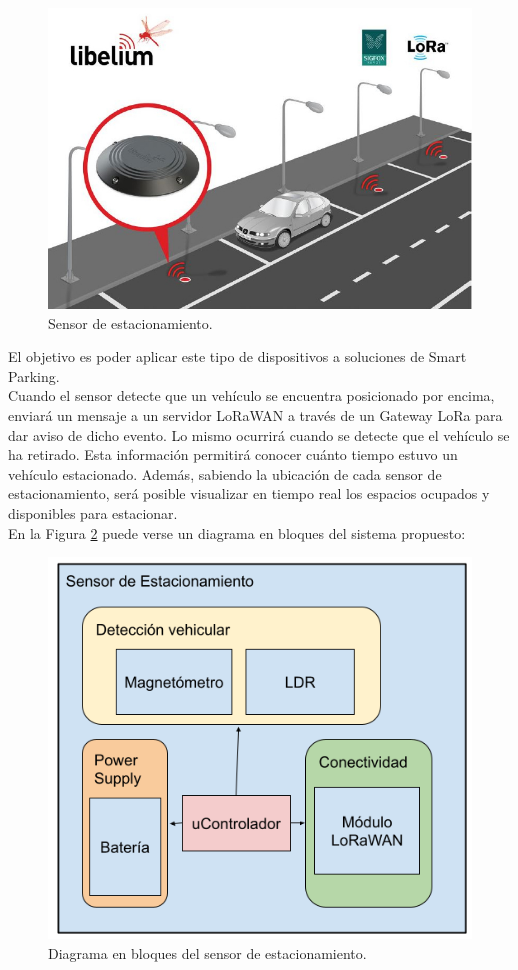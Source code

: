 \documentclass[
11pt, %
]{charter}
\begin{document}
\vspace{25px}

\begin{figure}[H]
\centering 
\includegraphics[width=.75\textwidth]{./Figuras/ParkingSensor.jpg}
\caption{Sensor de estacionamiento.}
\label{fig:ParkingSensor}
\end{figure}

\vspace{25px}

El objetivo es poder aplicar este tipo de dispositivos a soluciones de Smart Parking.\\
Cuando el sensor detecte que un vehículo se encuentra posicionado por encima, enviará un mensaje a un servidor LoRaWAN a través de un Gateway LoRa para dar aviso de dicho evento. Lo mismo ocurrirá cuando se detecte que el vehículo se ha retirado. Esta información permitirá conocer cuánto tiempo estuvo un vehículo estacionado. Además, sabiendo la ubicación de cada sensor de estacionamiento, será posible visualizar en tiempo real los espacios ocupados y disponibles para estacionar.\\
En la Figura \ref{fig:ParkingSensorDiagram} puede verse un diagrama en bloques del sistema propuesto:

\vspace{25px}

\begin{figure}[H]
\centering 
\includegraphics[width=.75\textwidth]{./Figuras/DiagramaBloqueSensor.png}
\caption{Diagrama en bloques del sensor de estacionamiento.}
\label{fig:ParkingSensorDiagram}
\end{figure}
\end{document}
